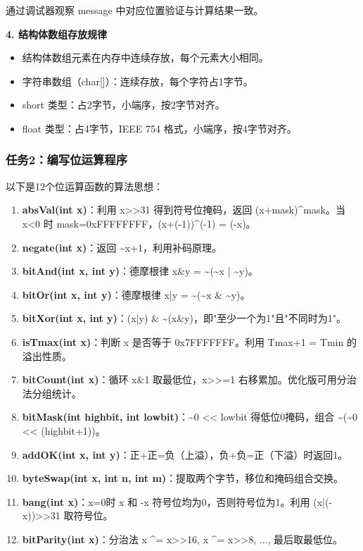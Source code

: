 通过调试器观察 message 中对应位置验证与计算结果一致。

\textbf{4. 结构体数组存放规律}
\begin{itemize}[nosep]
    \item 结构体数组元素在内存中连续存放，每个元素大小相同。
    \item 字符串数组（char[]）：连续存放，每个字符占1字节。
    \item short 类型：占2字节，小端序，按2字节对齐。
    \item float 类型：占4字节，IEEE 754 格式，小端序，按4字节对齐。
\end{itemize}

\subsubsection*{任务2：编写位运算程序}

以下是12个位运算函数的算法思想：

\begin{enumerate}[label=（\arabic*）,nosep]
    \item \textbf{absVal(int x)}：利用 x>>31 得到符号位掩码，返回 (x+mask)\^{}mask。当 x<0 时 mask=0xFFFFFFFF，(x+(-1))\^{}(-1) = (-x)。
    \item \textbf{negate(int x)}：返回 \~{}x+1，利用补码原理。
    \item \textbf{bitAnd(int x, int y)}：德摩根律 x\&y = \~{}(\~{}x | \~{}y)。
    \item \textbf{bitOr(int x, int y)}：德摩根律 x|y = \~{}(\~{}x \& \~{}y)。
    \item \textbf{bitXor(int x, int y)}：(x|y) \& \~{}(x\&y)，即"至少一个为1"且"不同时为1"。
    \item \textbf{isTmax(int x)}：判断 x 是否等于 0x7FFFFFFF。利用 Tmax+1 = Tmin 的溢出性质。
    \item \textbf{bitCount(int x)}：循环 x\&1 取最低位，x>>=1 右移累加。优化版可用分治法分组统计。
    \item \textbf{bitMask(int highbit, int lowbit)}：\~{}0 << lowbit 得低位0掩码，组合 \~{}(\~{}0 << (highbit+1))。
    \item \textbf{addOK(int x, int y)}：正+正=负（上溢），负+负=正（下溢）时返回1。
    \item \textbf{byteSwap(int x, int n, int m)}：提取两个字节，移位和掩码组合交换。
    \item \textbf{bang(int x)}：x=0时 x 和 -x 符号位均为0，否则符号位为1。利用 (x|(-x))>>31 取符号位。
    \item \textbf{bitParity(int x)}：分治法 x \^{}= x>>16, x \^{}= x>>8, ..., 最后取最低位。
\end{enumerate}

